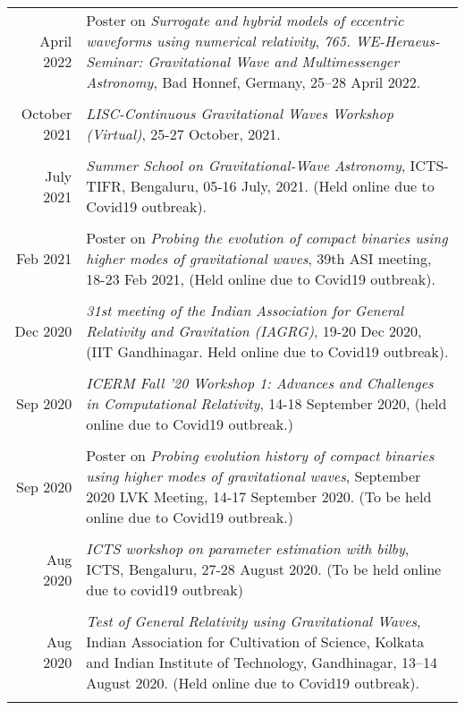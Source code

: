 \documentclass[10pt]{article}
\begin{document}
\begin{longtable}{rp{14cm}}
  April 2022 & Poster on {\itshape Surrogate and hybrid models of eccentric waveforms using numerical relativity}, {\itshape 765. WE-Heraeus-Seminar: Gravitational Wave and Multimessenger Astronomy}, Bad Honnef, Germany, 25--28 April 2022.\\\\
  October 2021 & {\itshape LISC-Continuous Gravitational Waves Workshop (Virtual)}, 25-27 October, 2021.\\\\
  July 2021 & {\itshape Summer School on Gravitational-Wave Astronomy}, ICTS-TIFR, Bengaluru, 05-16 July, 2021. (Held online due to Covid19 outbreak).\\\\ 
  Feb 2021 & {Poster} on {\itshape Probing the evolution of compact binaries using higher modes of gravitational waves}, 39th ASI meeting, 18-23 Feb 2021, (Held online due to Covid19 outbreak).\\\\  
  Dec 2020 & {\itshape 31st meeting of the Indian Association for General Relativity and Gravitation (IAGRG)}, 19-20 Dec 2020, (IIT Gandhinagar. Held online due to Covid19 outbreak).\\\\

  Sep 2020 & {\itshape ICERM Fall '20 Workshop 1: Advances and Challenges in  
             Computational Relativity}, 14-18 September 2020, (held online due
             to Covid19 outbreak.)\\\\
  Sep 2020 & {Poster} on {\itshape Probing evolution history of compact
             binaries using higher modes of gravitational waves}, September 2020 LVK Meeting, 14-17 September 2020. (To be held online due to Covid19 outbreak.)\\\\

  Aug 2020 & {\itshape ICTS workshop on parameter estimation with bilby}, ICTS, Bengaluru, 27-28 August 2020. (To be held online due to covid19 outbreak)\\\\
  
  Aug 2020 & {\itshape Test of General Relativity using Gravitational Waves}, Indian Association for Cultivation of Science, Kolkata and Indian Institute of Technology, Gandhinagar, 13--14 August 2020. (Held online due to Covid19 outbreak).\\\\
  

\end{longtable}
\end{document}
